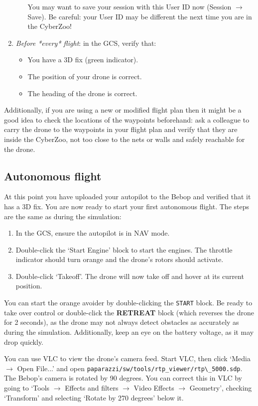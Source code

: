 \begin{enumerate}
\begin{enumerate}
		You may want to save your session with this User ID now (Session $\rightarrow$ Save). Be careful: your User ID may be different the next time you are in the CyberZoo!
	\end{enumerate}
	\item \emph{Before *every* flight}: in the GCS, verify that:
	\begin{itemize}
		\item You have a 3D fix (green indicator).
		\item The position of your drone is correct.
		\item The heading of the drone is correct.
	\end{itemize}
\end{enumerate}
	
Additionally, if you are using a new or modified flight plan then it might be a good idea to check the locations of the waypoints beforehand: ask a colleague to carry the drone to the waypoints in your flight plan and verify that they are inside the CyberZoo, not too close to the nets or walls and safely reachable for the drone.
	
\subsection*{Autonomous flight}
At this point you have uploaded your autopilot to the Bebop and verified that it has a 3D fix.
You are now ready to start your first autonomous flight.
The steps are the same as during the simulation:

\begin{enumerate}
	\item In the GCS, ensure the autopilot is in NAV mode.
	\item Double-click the `Start Engine' block to start the engines. The throttle indicator should turn orange and the drone's rotors should activate.
	\item Double-click `Takeoff'. The drone will now take off and hover at its current position.
\end{enumerate}

You can start the orange avoider by double-clicking the \texttt{START} block. Be ready to take over control or double-click the \textbf{RETREAT} block (which reverses the drone for 2 seconds), as the drone may not always detect obstacles as accurately as during the simulation. Additionally, keep an eye on the battery voltage, as it may drop quickly.

You can use VLC to view the drone's camera feed. Start VLC, then click `Media $\rightarrow$ Open File...' and open \verb"paparazzi/sw/tools/rtp_viewer/rtp\_5000.sdp".
The Bebop's camera is rotated by 90 degrees. You can correct this in VLC by going to `Tools $\rightarrow$ Effects and filters $\rightarrow$ Video Effects $\rightarrow$ Geometry', checking `Transform' and selecting `Rotate by 270 degrees' below it.


